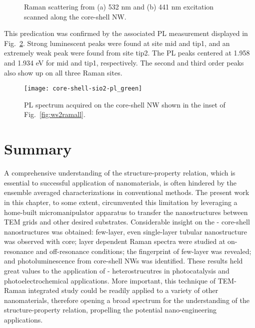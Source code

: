 \begin{figure}[htb]
\centering
{}\hspace{0.04\textwidth}
\caption[Raman scattering from (a) 532 nm and (b) 441 nm excitation scanned along the core-shell NW]{Raman scattering from (a) 532 nm and (b) 441 nm excitation scanned along the core-shell NW.}
\label{fig:ws2ram3site}
\end{figure}
This predication was confirmed by the associated PL measurement displayed in Fig.~\ref{fig:ws2plgreen}. Strong luminescent peaks were found at site mid and tip1, and an extremely weak peak were found from site tip2. The PL peaks centered at 1.958 and 1.934 eV for mid and tip1, respectively. The second and third order peaks also show up on all three Raman sites. 
\begin{figure}[htb]
\centering
\texttt{[image: core-shell-sio2-pl\_green]}
\caption[PL spectra of - on -Si]{PL spectrum acquired on the core-shell NW shown in the inset of Fig.~\ref{fig:ws2ramall}.}
\label{fig:ws2plgreen}
\end{figure}

\section{Summary} 

A comprehensive understanding of the structure-property relation, which is essential to successful application of nanomaterials, is often hindered by the ensemble averaged characterizations in conventional methods. The present work in this chapter, to some extent, circumvented this limitation by leveraging a home-built micromanipulator apparatus to transfer the nanostructures between TEM grids and other desired substrates. Considerable insight on the - core-shell nanostructures was obtained: few-layer, even single-layer tubular  nanostructure was observed with  core; layer dependent Raman spectra were studied at on-resonance and off-resonance conditions; the fingerprint of few-layer  was revealed; and photoluminescence from core-shell NWs was identified. These results held great values to the application of - heterostrucutres in photocatalysis and photoelectrochemical applications. More important, this technique of TEM-Raman integrated study could be readily applied to a variety of other nanomaterials, therefore opening a broad spectrum for the understanding of the structure-property relation, propelling the potential nano-engineering applications. 

